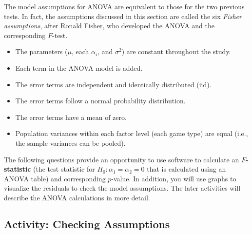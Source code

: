 \documentclass[
]{book}
\providecommand{\tightlist}{%
  \setlength{\itemsep}{0pt}\setlength{\parskip}{0pt}}
\begin{document}
The model assumptions for ANOVA are equivalent to those for the two previous tests. In fact, the assumptions discussed in this section are called the six \emph{Fisher assumptions}, after Ronald Fisher, who developed the ANOVA and the corresponding \(F\)-test.

\begin{itemize}
\tightlist
\item
  The parameters (\(\mu\), each \(\alpha_i\), and \(\sigma^2\)) are constant throughout the study.
\item
  Each term in the ANOVA model is added.
\item
  The error terms are independent and identically distributed (iid).
\item
  The error terms follow a normal probability distribution.
\item
  The error terms have a mean of zero.
\item
  Population variances within each factor level (each game type) are equal (i.e., the sample variances can be pooled).
\end{itemize}

The following questions provide an opportunity to use software to calculate an \textbf{\(F\)-statistic} (the test statistic for \(H_0: \alpha_1 = \alpha_2 = 0\) that is calculated using an ANOVA table) and corresponding \(p\)-value. In addition, you will use graphs to visualize the residuals to check the model assumptions. The later activities will describe the ANOVA calculations in more detail.

\hypertarget{activity-checking-assumptions}{%
\subsection*{Activity: Checking Assumptions}\label{activity-checking-assumptions}}
\end{document}
